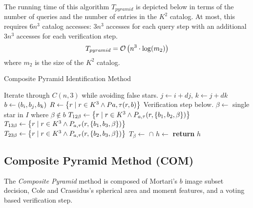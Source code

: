 \documentclass[conference]{IEEEtran}
\begin{document}
    The running time of this algorithm $T_{pyramid}$ is depicted below in terms of the number of queries and the number
    of entries in the $K^2$ catalog.
    At most, this requires $6n^3$ catalog accesses: $3n^3$ accesses for each query step with an additional $3n^3$ accesses
    for each verification step.
    \begin{equation}
        T_{pyramid} = \mathcal{O} \left( n^3 \cdot \log( m_2 ) \right)
    \end{equation}
    where $m_2$ is the size of the $K^2$ catalog.


    \begin{algorithm}
        \caption{Composite Pyramid Identification Method}\label{algorithm:compositePyramid}
        \begin{algorithmic}[1]
            \LineComment Iterate through $C(n, 3)$ while avoiding false stars.
            \State $j \gets i + dj$, $k \gets j + dk$
            \State $b \gets (b_i, b_j, b_k)$
            \State $R \gets \left\{  r \mid r \in K^3 \land P{a, \tau}(r, b)  \right\}$
            \LineComment Verification step below.
            \State $\beta \gets $ single star in $I$ where $\beta \notin b$
            \State $T_{12\beta} \gets \left\{  r \mid r \in K^3 \land P_{a, \tau}(r, \left\{ b_1, b_2, \beta \right\}) \right\}$
            \State $T_{13\beta} \gets \left\{  r \mid r \in K^3 \land P_{a, \tau}(r, \left\{ b_1, b_3, \beta \right\}) \right\}$
            \State $T_{23\beta} \gets \left\{  r \mid r \in K^3 \land P_{a, \tau} (r, \left\{ b_2, b_3, \beta \right\}) \right\}$
            \State $T_\beta \gets $  $\cap$ 
            \State $h \gets$ 
            \invalidBijection
            \State \textbf{return} $h$
            \EndIf
            \EndIf
            \EndIf
            \EndFor
            \EndFor
            \EndFor
            \EndFunction
        \end{algorithmic}
    \end{algorithm}

    \subsection{Composite Pyramid Method (COM)}\label{subsec:compositePyramidMethod}
    The \textit{Composite Pyramid} method is composed of Mortari's $b$ image subset decision, Cole and Crassidus's
    spherical area and moment features, and a voting based verification step.
\end{document}
